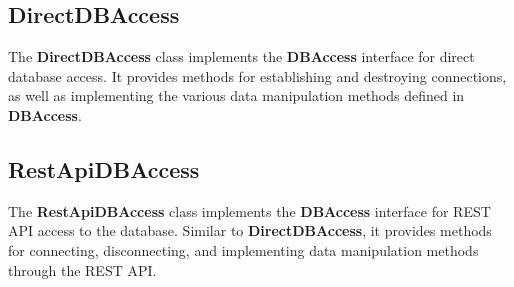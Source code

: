 \subsection{DirectDBAccess}

The \textbf{DirectDBAccess} class implements the \textbf{DBAccess} interface for 
direct database access. 
It provides methods for establishing and destroying connections, as well as 
implementing the various data manipulation methods defined in \textbf{DBAccess}.

\subsection{RestApiDBAccess}

The \textbf{RestApiDBAccess} class implements the \textbf{DBAccess} interface 
for REST API access to the database. 
Similar to \textbf{DirectDBAccess}, it provides methods for connecting, 
disconnecting, and implementing data manipulation methods through the REST API.

